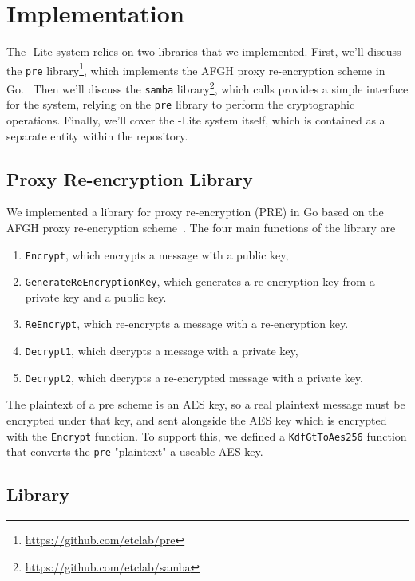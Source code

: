 \section{Implementation}
\label{sec:implementation}

The \SystemName-Lite system relies on two libraries that we implemented. First, we'll discuss the \texttt{pre} library\footnote{\url{https://github.com/etclab/pre}},
which implements the AFGH proxy re-encryption scheme in Go.~\cite{05-ndss-improved_proxy_reencryption}
Then we'll discuss the \texttt{samba} library\footnote{\url{https://github.com/etclab/samba}}, which calls provides a simple interface for the \SystemName system, relying on the \texttt{pre} library to perform the cryptographic operations.
Finally, we'll cover the \SystemName-Lite system itself, which is contained as a separate entity within the \SystemName repository.

\subsection{Proxy Re-encryption Library}
\label{sec:PRE}
%
We implemented a library for proxy re-encryption (PRE) in Go based on the AFGH proxy re-encryption scheme~\cite{05-ndss-improved_proxy_reencryption}.
The four main functions of the library are 
\begin{enumerate}
	\item \texttt{Encrypt}, which encrypts a message with a public key,
	\item \texttt{GenerateReEncryptionKey}, which generates a re-encryption key from a private key and a public key.
	\item \texttt{ReEncrypt}, which re-encrypts a message with a re-encryption key.
	\item \texttt{Decrypt1}, which decrypts a message with a private key,
	\item \texttt{Decrypt2}, which decrypts a re-encrypted message with a private key.
\end{enumerate}

The plaintext of a pre scheme is an AES key, so a real plaintext message must be encrypted under that key, and sent alongside the AES key which is encrypted with the \texttt{Encrypt} function.
To support this, we defined a \texttt{KdfGtToAes256} function that converts the \texttt{pre} "plaintext" a useable AES key.

\subsection{\SystemName Library}

